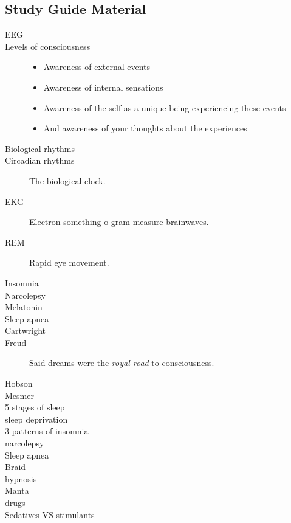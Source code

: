 \documentclass{article}
\begin{document}
\subsection{Study Guide Material}
\begin{description}
    \item [EEG]
    \item [Levels of consciousness]
    \begin{itemize}
        \item Awareness of external events
        \item Awareness of internal sensations
        \item Awareness of the self as a unique being experiencing these events
        \item And awareness of your thoughts about the experiences
    \end{itemize}

    \item [Biological rhythms]
    \item [Circadian rhythms] The biological clock.
    \item [EKG] Electron-something o-gram measure brainwaves.
    \item [REM] Rapid eye movement.
    \item [Insomnia]
    \item [Narcolepsy]
    \item [Melatonin]
    \item [Sleep apnea]
    \item [Cartwright]
    \item [Freud] Said dreams were the \textit{royal road} to consciousness.
    \item [Hobson]
    \item [Mesmer]
    \item [5 stages of sleep]
    \item [sleep deprivation]
    \item [3 patterns of insomnia]
    \item [narcolepsy]
    \item [Sleep apnea]
    \item [Braid]
    \item [hypnosis]
    \item [Manta]
    \item [drugs]
    \item [Sedatives VS stimulants]
\end{description}
\end{document}
